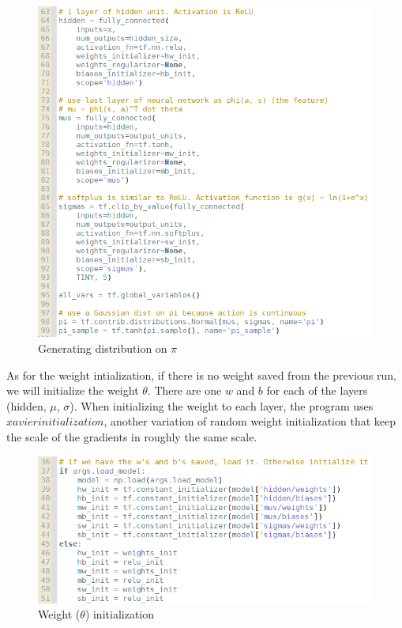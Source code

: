 \documentclass[11pt,twoside]{article}
\begin{document}
\begin{figure}[h]
	\centering
	\includegraphics[scale=0.8]{part1_mu&sigma.png}
	\caption*{Generating distribution on $\pi$}
\end{figure}

As for the weight intialization, if there is no weight saved from the previous run, we will initialize the weight $\theta$. There are one $w$ and $b$ for each of the layers (hidden, $\mu$, $\sigma$). When initializing the weight to each layer, the program uses $xavier initialization$, another variation of random weight initialization that keep the scale of the gradients in roughly the same scale.

\begin{figure}[h]
	\centering
	\includegraphics[scale=0.8]{part1_weight_init.png}
	\caption*{Weight ($\theta$) initialization}
\end{figure}
\end{document}
